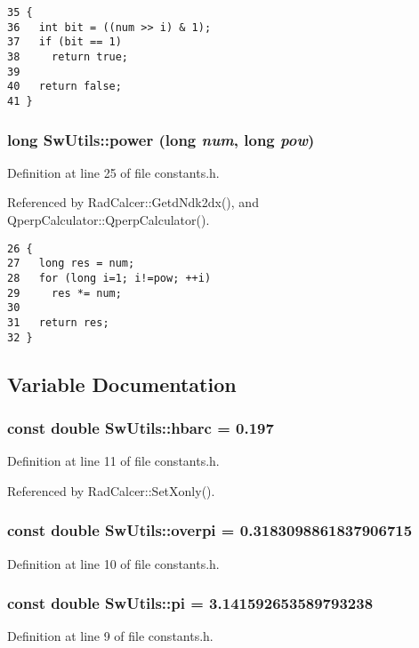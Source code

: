 \begin{Code}\begin{verbatim}35 {
36   int bit = ((num >> i) & 1);
37   if (bit == 1)
38     return true;
39     
40   return false;
41 }
\end{verbatim}
\end{Code}


\subsubsection{\setlength{\rightskip}{0pt plus 5cm}long SwUtils::power (long {\em num}, long {\em pow})\hspace{0.3cm}{\tt  [inline]}}\label{namespaceSwUtils_3974619c250bd02a70c9cfcd88384223}




Definition at line 25 of file constants.h.

Referenced by RadCalcer::GetdNdk2dx(), and QperpCalculator::QperpCalculator().

\begin{Code}\begin{verbatim}26 {
27   long res = num;
28   for (long i=1; i!=pow; ++i)
29     res *= num;
30 
31   return res;
32 }
\end{verbatim}
\end{Code}




\subsection{Variable Documentation}
\subsubsection{\setlength{\rightskip}{0pt plus 5cm}const double {\bf SwUtils::hbarc} = 0.197}\label{namespaceSwUtils_d2fad768d402d77bfb40f4c87adb8966}




Definition at line 11 of file constants.h.

Referenced by RadCalcer::SetXonly().
\subsubsection{\setlength{\rightskip}{0pt plus 5cm}const double {\bf SwUtils::overpi} = 0.3183098861837906715}\label{namespaceSwUtils_b08cebc8959f71a8ae78b8d56c6d6be6}




Definition at line 10 of file constants.h.
\subsubsection{\setlength{\rightskip}{0pt plus 5cm}const double {\bf SwUtils::pi} = 3.141592653589793238}\label{namespaceSwUtils_3e747e4d95465902347281e3cc1bcb0d}




Definition at line 9 of file constants.h.